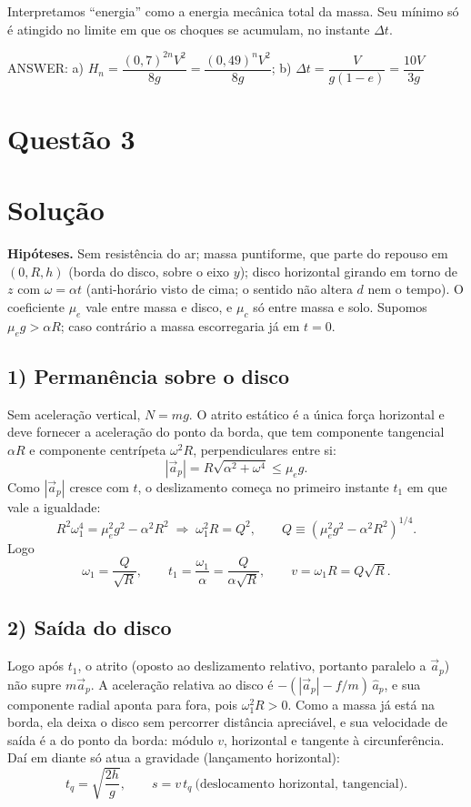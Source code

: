 \documentclass{article}%
\begin{document}
\medskip
\noindent Interpretamos ``energia'' como a energia mecânica total da massa. Seu mínimo só é atingido no limite em que os choques se acumulam, no instante $\Delta t$.

ANSWER: a) $H_n=\dfrac{(0{,}7)^{2n}V^2}{8g}=\dfrac{(0{,}49)^nV^2}{8g}$; b) $\Delta t=\dfrac{V}{g(1-e)}=\dfrac{10V}{3g}$%
\newpage%
\section*{Questão 3}

\section*{Solução}

\textbf{Hipóteses.} Sem resistência do ar; massa puntiforme, que parte do repouso em $(0,R,h)$ (borda do disco, sobre o eixo $y$); disco horizontal girando em torno de $z$ com $\omega=\alpha t$ (anti-horário visto de cima; o sentido não altera $d$ nem o tempo). O coeficiente $\mu_e$ vale entre massa e disco, e $\mu_c$ só entre massa e solo. Supomos $\mu_e g>\alpha R$; caso contrário a massa escorregaria já em $t=0$.

\subsection*{1) Permanência sobre o disco}
Sem aceleração vertical, $N=mg$. O atrito estático é a única força horizontal e deve fornecer a aceleração do ponto da borda, que tem componente tangencial $\alpha R$ e componente centrípeta $\omega^2R$, perpendiculares entre si:
\[
|\vec a_p|=R\sqrt{\alpha^2+\omega^4}\le \mu_e g .
\]
Como $|\vec a_p|$ cresce com $t$, o deslizamento começa no primeiro instante $t_1$ em que vale a igualdade:
\[
R^2\omega_1^4=\mu_e^2g^2-\alpha^2R^2
\;\Rightarrow\;
\omega_1^2R=Q^2,\qquad Q\equiv\left(\mu_e^2g^2-\alpha^2R^2\right)^{1/4}.
\]
Logo
\[
\omega_1=\frac{Q}{\sqrt R},\qquad t_1=\frac{\omega_1}{\alpha}=\frac{Q}{\alpha\sqrt R},\qquad v=\omega_1R=Q\sqrt R .
\]

\subsection*{2) Saída do disco}
Logo após $t_1$, o atrito (oposto ao deslizamento relativo, portanto paralelo a $\vec a_p$) não supre $m\vec a_p$. A aceleração relativa ao disco é $-(|\vec a_p|-f/m)\,\hat a_p$, e sua componente radial aponta para fora, pois $\omega_1^2R>0$. Como a massa já está na borda, ela deixa o disco sem percorrer distância apreciável, e sua velocidade de saída é a do ponto da borda: módulo $v$, horizontal e tangente à circunferência. Daí em diante só atua a gravidade (lançamento horizontal):
\[
t_q=\sqrt{\frac{2h}{g}},\qquad s=v\,t_q \ \text{(deslocamento horizontal, tangencial).}
\]
\end{document}
